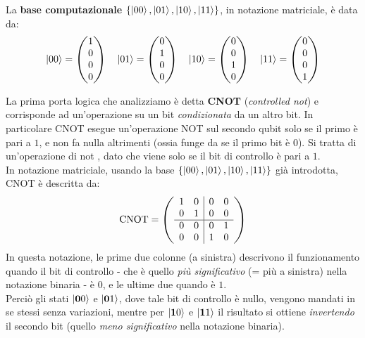 \documentclass[../../InformazioneQuantistica.tex]{subfiles}
\begin{document}
La \textbf{base computazionale} $\{\Ket{00}, \Ket{01}, \Ket{10}, \Ket{11}\}$, in notazione matriciale, è data da:
\begin{align*}
\Ket{00} = \begin{pmatrix}1 \\ 0 \\ 0 \\ 0 \end{pmatrix} \quad
\Ket{01} = \begin{pmatrix}0 \\ 1 \\ 0 \\ 0 \end{pmatrix} \quad
\Ket{10} = \begin{pmatrix}0 \\ 0 \\ 1 \\ 0 \end{pmatrix} \quad
\Ket{11} = \begin{pmatrix}0 \\ 0 \\ 0 \\ 1 \end{pmatrix}
\end{align*}

La prima porta logica che analizziamo è detta \textbf{CNOT} (\textit{controlled not})  e corrisponde ad un'operazione su un bit \textit{condizionata} da un altro bit. In particolare CNOT esegue un'operazione NOT sul secondo qubit solo se il primo è pari a $1$, e non fa nulla altrimenti (ossia funge da  se il primo bit è $0$). Si tratta di un'operazione di not , dato che viene  solo se il bit di controllo è pari a $1$.\\
In notazione matriciale, usando la base $\{\Ket{00}, \Ket{01}, \Ket{10}, \Ket{11}\}$ già introdotta, CNOT è descritta da:
\begin{align*}
\operatorname{CNOT} =
\left(
        \begin{array}{cc|cc}
        1 & 0 & 0 & 0 \\
        0 & 1 & 0 & 0 \\
        \hline
        0 & 0 & 0 & 1 \\
        0 & 0 & 1 & 0 \\        
        \end{array}
\right)
\end{align*}
In questa notazione, le prime due colonne (a sinistra) descrivono il funzionamento quando il bit di controllo - che è quello \textit{più significativo} (= più a sinistra) nella notazione binaria - è $0$, e le ultime due quando è $1$.\\
Perciò gli stati $\Ket{\bm{0}0}$ e $\Ket{\bm{0}1}$, dove tale bit di controllo è nullo, vengono mandati in se stessi senza variazioni, mentre per $\Ket{\bm{1}0}$ e $\Ket{\bm{1}1}$ il risultato si ottiene \textit{invertendo} il secondo bit (quello \textit{meno significativo} nella notazione binaria).\\
\end{document}

